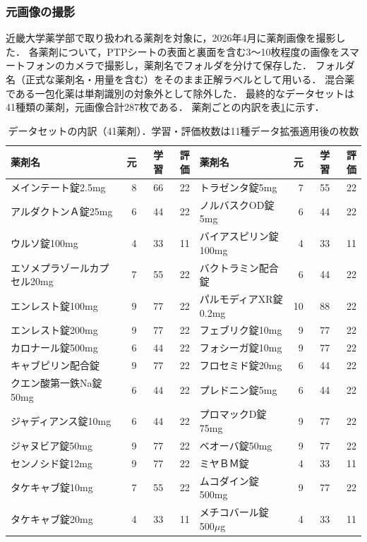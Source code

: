 \documentclass[dvipdfmx]{jsarticle}
\begin{document}
\subsubsection{元画像の撮影}

近畿大学薬学部で取り扱われる薬剤を対象に，2026年4月に薬剤画像を撮影した．
各薬剤について，PTPシートの表面と裏面を含む3〜10枚程度の画像をスマートフォンのカメラで撮影し，薬剤名でフォルダを分けて保存した．
フォルダ名（正式な薬剤名・用量を含む）をそのまま正解ラベルとして用いる．
混合薬である一包化薬は単剤識別の対象外として除外した．
最終的なデータセットは41種類の薬剤，元画像合計287枚である．
薬剤ごとの内訳を表\ref{tab:dataset}に示す．

\begin{table}[htbp]
\centering
\caption{データセットの内訳（41薬剤）．学習・評価枚数は11種データ拡張適用後の枚数}
\label{tab:dataset}
\scriptsize
\setlength{\tabcolsep}{3pt}
\begin{tabular}{lrrr|lrrr}
\hline
薬剤名 & 元 & 学習 & 評価 & 薬剤名 & 元 & 学習 & 評価 \\
\hline
メインテート錠2.5mg & 8 & 66 & 22 & トラゼンタ錠5mg & 7 & 55 & 22 \\
アルダクトンＡ錠25mg & 6 & 44 & 22 & ノルバスクOD錠5mg & 6 & 44 & 22 \\
ウルソ錠100mg & 4 & 33 & 11 & バイアスピリン錠100mg & 4 & 33 & 11 \\
エソメプラゾールカプセル20mg & 7 & 55 & 22 & バクトラミン配合錠 & 6 & 44 & 22 \\
エンレスト錠100mg & 9 & 77 & 22 & パルモディアXR錠0.2mg & 10 & 88 & 22 \\
エンレスト錠200mg & 9 & 77 & 22 & フェブリク錠10mg & 9 & 77 & 22 \\
カロナール錠500mg & 6 & 44 & 22 & フォシーガ錠10mg & 9 & 77 & 22 \\
キャブピリン配合錠 & 9 & 77 & 22 & フロセミド錠20mg & 6 & 44 & 22 \\
クエン酸第一鉄Na錠50mg & 6 & 44 & 22 & プレドニン錠5mg & 6 & 44 & 22 \\
ジャディアンス錠10mg & 6 & 44 & 22 & プロマックD錠75mg & 9 & 77 & 22 \\
ジャヌビア錠50mg & 9 & 77 & 22 & ベオーバ錠50mg & 9 & 77 & 22 \\
センノシド錠12mg & 9 & 77 & 22 & ミヤＢＭ錠 & 4 & 33 & 11 \\
タケキャブ錠10mg & 7 & 55 & 22 & ムコダイン錠500mg & 9 & 77 & 22 \\
タケキャブ錠20mg & 4 & 33 & 11 & メチコバール錠500$\mu$g & 4 & 33 & 11 \\

\end{tabular}
\end{table}
\end{document}
